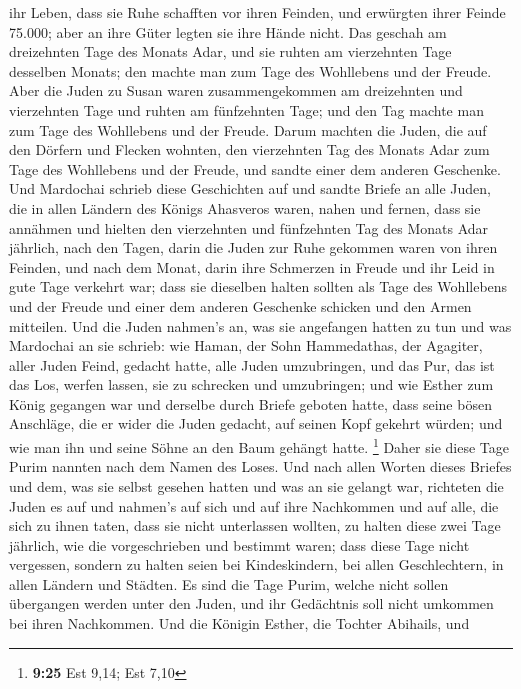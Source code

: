 ihr Leben, dass sie Ruhe schafften vor ihren Feinden, und erwürgten
ihrer Feinde 75.000; aber an ihre Güter legten sie ihre Hände nicht.
 Das geschah am dreizehnten Tage des Monats Adar, und sie
ruhten am vierzehnten Tage desselben Monats; den machte man zum Tage des
Wohllebens und der Freude.  Aber die Juden zu Susan waren
zusammengekommen am dreizehnten und vierzehnten Tage und ruhten am
fünfzehnten Tage; und den Tag machte man zum Tage des Wohllebens und der
Freude.  Darum machten die Juden, die auf den Dörfern und
Flecken wohnten, den vierzehnten Tag des Monats Adar zum Tage des
Wohllebens und der Freude, und sandte einer dem anderen Geschenke.
 Und Mardochai schrieb diese Geschichten auf und sandte
Briefe an alle Juden, die in allen Ländern des Königs Ahasveros waren,
nahen und fernen,  dass sie annähmen und hielten den
vierzehnten und fünfzehnten Tag des Monats Adar jährlich, 
nach den Tagen, darin die Juden zur Ruhe gekommen waren von ihren
Feinden, und nach dem Monat, darin ihre Schmerzen in Freude und ihr Leid
in gute Tage verkehrt war; dass sie dieselben halten sollten als Tage
des Wohllebens und der Freude und einer dem anderen Geschenke schicken
und den Armen mitteilen.  Und die Juden nahmen's an, was
sie angefangen hatten zu tun und was Mardochai an sie schrieb:
 wie Haman, der Sohn Hammedathas, der Agagiter, aller Juden
Feind, gedacht hatte, alle Juden umzubringen, und das Pur, das ist das
Los, werfen lassen, sie zu schrecken und umzubringen;  und
wie Esther zum König gegangen war und derselbe durch Briefe geboten
hatte, dass seine bösen Anschläge, die er wider die Juden gedacht, auf
seinen Kopf gekehrt würden; und wie man ihn und seine Söhne an den Baum
gehängt hatte. \footnote{\textbf{9:25} Est 9,14; Est 7,10} 
Daher sie diese Tage Purim nannten nach dem Namen des Loses. Und nach
allen Worten dieses Briefes und dem, was sie selbst gesehen hatten und
was an sie gelangt war,  richteten die Juden es auf und
nahmen's auf sich und auf ihre Nachkommen und auf alle, die sich zu
ihnen taten, dass sie nicht unterlassen wollten, zu halten diese zwei
Tage jährlich, wie die vorgeschrieben und bestimmt waren; 
dass diese Tage nicht vergessen, sondern zu halten seien bei
Kindeskindern, bei allen Geschlechtern, in allen Ländern und Städten. Es
sind die Tage Purim, welche nicht sollen übergangen werden unter den
Juden, und ihr Gedächtnis soll nicht umkommen bei ihren Nachkommen.
 Und die Königin Esther, die Tochter Abihails, und
